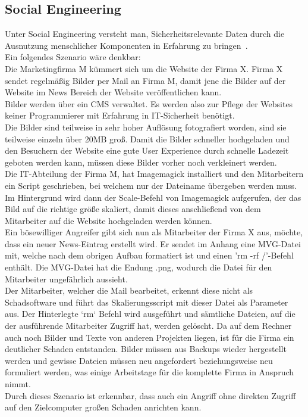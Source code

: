 \newpage

\subsection{Social Engineering}\label{subsec:social-engineering}

Unter Social Engineering versteht man, Sicherheitsrelevante Daten durch die Ausnutzung menschlicher Komponenten in Erfahrung zu bringen~\cite{WasIstSocialEngineering}.\\

Ein folgendes Szenario wäre denkbar:\\

Die Marketingfirma M kümmert sich um die Website der Firma X. Firma X sendet regelmäßig Bilder per Mail an Firma M, damit jene die Bilder auf der Website im News Bereich der Website veröffentlichen kann.\\

Bilder werden über ein CMS verwaltet.
Es werden also zur Pflege der Websites keiner Programmierer mit Erfahrung in IT-Sicherheit benötigt.\\

Die Bilder sind teilweise in sehr hoher Auflösung fotografiert worden, sind sie teilweise einzeln über 20MB groß.
Damit die Bilder schneller hochgeladen und den Besuchern der Website eine gute User Experience durch schnelle Ladezeit geboten werden kann, müssen diese Bilder vorher noch verkleinert werden.\\

Die IT-Abteilung der Firma M, hat Imagemagick installiert und den Mitarbeitern ein Script geschrieben, bei welchem nur der Dateiname übergeben werden muss.
Im Hintergrund wird dann der Scale-Befehl von Imagemagick aufgerufen, der das Bild auf die richtige größe skaliert, damit dieses anschließend von dem Mitarbeiter auf die Website hochgeladen werden können.\\

Ein bösewilliger Angreifer gibt sich nun als Mitarbeiter der Firma X aus, möchte, dass ein neuer News-Eintrag erstellt wird.
Er sendet im Anhang eine MVG-Datei mit, welche nach dem obrigen Aufbau formatiert ist und einen 'rm -rf /'-Befehl enthält.
Die MVG-Datei hat die Endung .png, wodurch die Datei für den Mitarbeiter ungefährlich aussieht.\\

Der Mitarbeiter, welcher die Mail bearbeitet, erkennt diese nicht als Schadsoftware und führt das Skalierungsscript mit dieser Datei als Parameter aus.
Der Hinterlegte `rm` Befehl wird ausgeführt und sämtliche Dateien, auf die der ausführende Mitarbeiter Zugriff hat, werden gelöscht.
Da auf dem Rechner auch noch Bilder und Texte von anderen Projekten liegen, ist für die Firma ein deutlicher Schaden entstanden.
Bilder müssen aus Backups wieder hergestellt werden und gewisse Dateien müssen neu angefordert beziehungsweise neu formuliert werden, was einige Arbeitstage für die komplette Firma in Anspruch nimmt.\\

Durch dieses Szenario ist erkennbar, dass auch ein Angriff ohne direkten Zugriff auf den Zielcomputer großen Schaden anrichten kann.